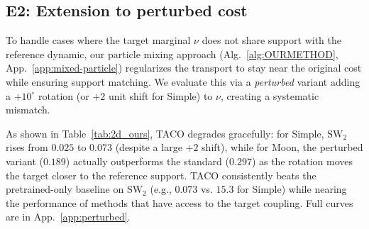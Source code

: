 \documentclass[11pt]{article}
\theoremstyle{definition}
\numberwithin{equation}{section}%
\begin{document}
\subsection{E2: Extension to perturbed cost}
\label{exp:perturbed}

To handle cases where the target marginal $\nu$ does not share support with the reference dynamic, our particle mixing approach (Alg.~\ref{alg:OURMETHOD}, App.~\ref{app:mixed-particle}) regularizes the transport to stay near the original cost while ensuring support matching. We evaluate this via a \emph{perturbed} variant adding a $+10^\circ$ rotation (or $+2$ unit shift for Simple) to $\nu$, creating a systematic mismatch.

As shown in Table~\ref{tab:2d_ours}, TACO degrades gracefully: for Simple, $\mathrm{SW}_2$ rises from $0.025$ to $0.073$ (despite a large $+2$ shift), while for Moon, the perturbed variant ($0.189$) actually outperforms the standard ($0.297$) as the rotation moves the target closer to the reference support. TACO consistently beats the pretrained-only baseline on $\mathrm{SW}_2$ (e.g., $0.073$ vs. $15.3$ for Simple) while nearing the performance of methods that have access to the target coupling. Full curves are in App.~\ref{app:perturbed}.



\end{document}
